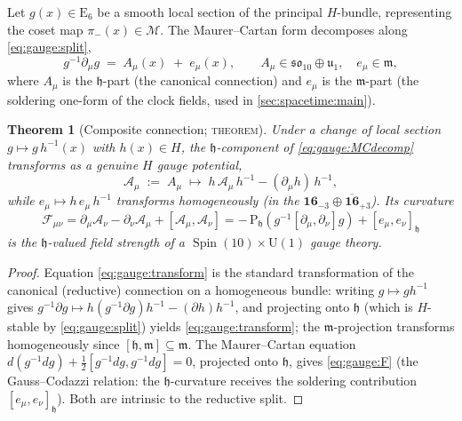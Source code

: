 \documentclass[11pt]{article}
\theoremstyle{plain}
\newtheorem{theorem}{Theorem}[section]
\theoremstyle{definition}
\theoremstyle{remark}
\newcommand{\U}[1]{\mathrm{U}(#1)}
\newcommand{\E}[1]{\mathrm{E}_{#1}}
\newcommand{\Spin}{\operatorname{Spin}}
\newcommand{\Uone}{\U{1}}
\newcommand{\ESix}{\E{6}}
\begin{document}
Let $g(x)\in\ESix$ be a smooth local section of the principal $H$-bundle,
representing the coset map $\pi_-(x)\in\mathcal M$. The Maurer--Cartan
form decomposes along \eqref{eq:gauge:split},
\begin{equation}\label{eq:gauge:MCdecomp}
  g^{-1}\partial_\mu g
  \;=\;
  A_\mu(x) \;+\; e_\mu(x),
  \qquad
  A_\mu\in\mathfrak{so}_{10}\oplus\mathfrak u_{1},
  \quad
  e_\mu\in\mathfrak m,
\end{equation}
where $A_\mu$ is the $\mathfrak h$-part (the canonical connection) and
$e_\mu$ is the $\mathfrak m$-part (the soldering one-form of the clock
fields, used in \autoref{sec:spacetime:main}).

\begin{theorem}[Composite connection; \textsc{theorem}]\label{thm:gauge:composite}
Under a change of local section $g\mapsto g\,h^{-1}(x)$ with
$h(x)\in H$, the $\mathfrak h$-component of \eqref{eq:gauge:MCdecomp}
transforms as a genuine $H$ gauge potential,
\begin{equation}\label{eq:gauge:transform}
  \mathcal A_\mu \;:=\; A_\mu
  \;\longmapsto\;
  h\,\mathcal A_\mu\,h^{-1} - (\partial_\mu h)\,h^{-1},
\end{equation}
while $e_\mu\mapsto h\,e_\mu\,h^{-1}$ transforms homogeneously (in the
$\mathbf{16}_{-3}\oplus\overline{\mathbf{16}}_{+3}$). Its curvature
\begin{equation}\label{eq:gauge:F}
  \mathcal F_{\mu\nu}
  =\partial_\mu\mathcal A_\nu-\partial_\nu\mathcal A_\mu
   +[\mathcal A_\mu,\mathcal A_\nu]
  = -\,\mathrm P_{\mathfrak h}\!\left(g^{-1}[\partial_\mu,\partial_\nu]g\right)
    + [e_\mu,e_\nu]_{\mathfrak h}
\end{equation}
is the $\mathfrak h$-valued field strength of a $\Spin(10)\times\Uone$
gauge theory.
\end{theorem}

\begin{proof}
Equation \eqref{eq:gauge:transform} is the standard transformation of the
canonical (reductive) connection on a homogeneous bundle: writing
$g\mapsto gh^{-1}$ gives
$g^{-1}\partial g\mapsto h(g^{-1}\partial g)h^{-1}-(\partial h)h^{-1}$,
and projecting onto $\mathfrak h$ (which is $H$-stable by
\eqref{eq:gauge:split}) yields \eqref{eq:gauge:transform}; the
$\mathfrak m$-projection transforms homogeneously since
$[\mathfrak h,\mathfrak m]\subseteq\mathfrak m$. The Maurer--Cartan
equation $d(g^{-1}dg)+\tfrac12[g^{-1}dg,g^{-1}dg]=0$, projected onto
$\mathfrak h$, gives \eqref{eq:gauge:F} (the Gauss--Codazzi relation:
the $\mathfrak h$-curvature receives the soldering contribution
$[e_\mu,e_\nu]_{\mathfrak h}$). Both are intrinsic to the reductive split.
\end{proof}
\end{document}
